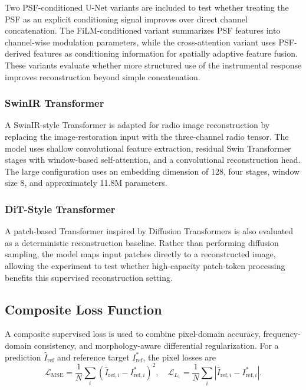 \documentclass[twocolumn]{aastex631}
\begin{document}
Two PSF-conditioned U-Net variants are included to test whether treating the PSF as an explicit conditioning signal improves over direct channel concatenation.
The FiLM-conditioned variant summarizes PSF features into channel-wise modulation parameters, while the cross-attention variant uses PSF-derived features as conditioning information for spatially adaptive feature fusion.
These variants evaluate whether more structured use of the instrumental response improves reconstruction beyond simple concatenation.

\subsubsection{SwinIR Transformer}

A SwinIR-style Transformer \citep{Liang2021} is adapted for radio image reconstruction by replacing the image-restoration input with the three-channel radio tensor.
The model uses shallow convolutional feature extraction, residual Swin Transformer stages with window-based self-attention, and a convolutional reconstruction head.
The large configuration uses an embedding dimension of 128, four stages, window size 8, and approximately 11.8M parameters.

\subsubsection{DiT-Style Transformer}

A patch-based Transformer inspired by Diffusion Transformers \citep{Peebles2023} is also evaluated as a deterministic reconstruction baseline.
Rather than performing diffusion sampling, the model maps input patches directly to a reconstructed image, allowing the experiment to test whether high-capacity patch-token processing benefits this supervised reconstruction setting.

\subsection{Composite Loss Function}
\label{sec:loss}

A composite supervised loss is used to combine pixel-domain accuracy, frequency-domain consistency, and morphology-aware differential regularization.
For a prediction $\hat{I}_{\mathrm{ref}}$ and reference target $I_{\mathrm{ref}}^*$, the pixel losses are
\begin{equation}
	\mathcal{L}_{\mathrm{MSE}} = \frac{1}{N}\sum_i
	\left(\hat{I}_{\mathrm{ref},i} - I_{\mathrm{ref},i}^*\right)^2,
	\quad
	\mathcal{L}_{L_1} = \frac{1}{N}\sum_i
	\left|\hat{I}_{\mathrm{ref},i} - I_{\mathrm{ref},i}^*\right|.
\end{equation}
\end{document}
